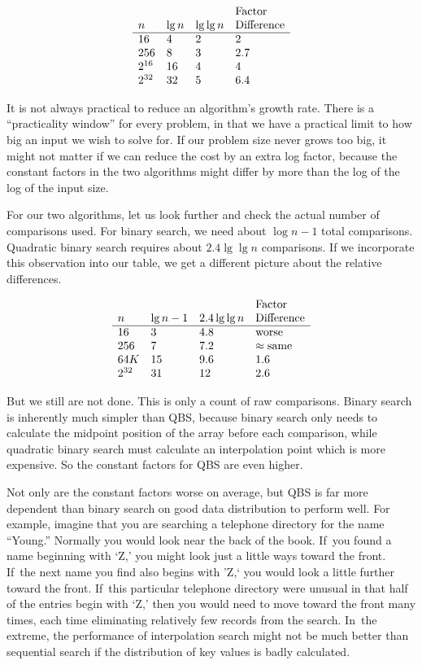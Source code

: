 {\small
\[\begin{array}{llll}
&&&{\rm Factor}\\
n  &\lg n&\lg \lg n&{\rm Difference}\\
\hline
16 &4    &2        &2\\
256&8    &3        &2.7\\
2^{16}&16   &4        &4\\
2^{32}&32  &5      &6.4\\
\end{array}\]
}

It is not always practical to reduce an algorithm's growth rate.
There is a ``practicality window'' for every problem, in that we have
a practical limit to how big an input we wish to solve for.
If our problem size never grows too big, it might not matter if we can
reduce the cost by an extra log factor, because the constant factors
in the two algorithms might differ by more than the log of the log of
the input size.

For our two algorithms, let us look further and check the actual
number of comparisons used. 
For binary search, we need about \(\log n-1\) total comparisons.
Quadratic binary search requires about \(2.4 \lg \lg n\) comparisons.
If we incorporate this observation into our table, we get a different
picture about the relative differences.

{\small
\[\begin{array}{llll}
&&&{\rm Factor}\\
n  &\lg n -1&2.4 \lg \lg n&{\rm Difference}\\
\hline
16&3&4.8&{\rm worse}\\
256&7&7.2&\approx {\rm same}\\
64K&15&9.6&1.6\\
2^{32}&31&12&2.6
\end{array}\]
}

But we still are not done.
This is only a count of raw comparisons.
Binary search is inherently much simpler than QBS,
because binary search only needs to calculate the midpoint position of
the array before each comparison, while quadratic binary search must
calculate an interpolation point which is more expensive.
So the constant factors for QBS are even higher.

Not only are the constant factors worse on average, but QBS
is far more dependent than binary search on good data
distribution to perform well.
For example, imagine that you are searching a telephone directory for
the name ``Young.''
Normally you would look near the back of the book.
If~you found a name beginning with `Z,' you might look just a little
ways toward the front.
If~the next name you find also begins with 'Z,` you would look a
little further toward the front.
If~this particular telephone directory were unusual in that half of the
entries begin with `Z,' then you would need to move toward
the front many times, each time eliminating relatively few records
from the search.
In~the extreme, the performance of interpolation search might not be
much better than sequential search if the distribution of key values
is badly calculated.

